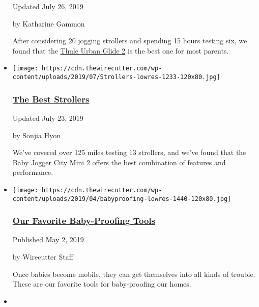 \begin{itemize}
  Updated July 26, 2019

  by Katharine Gammon

  After considering 20 jogging strollers and spending 15 hours testing
  six, we found that the
  \href{https://www.nytimes3xbfgragh.onion/wirecutter/out/link/25112/151217/4/71872/?merchant=BuyBuy\%20Baby}{Thule
  Urban Glide 2} is the best one for most parents.
\item
  \href{https://www.nytimes3xbfgragh.onion/wirecutter/reviews/best-strollers/}{}

  \texttt{[image: https://cdn.thewirecutter.com/wp-content/uploads/2019/07/Strollers-lowres-1233-120x80.jpg]}

  \hypertarget{the-best-strollers}{%
  \subsubsection{\texorpdfstring{\href{https://www.nytimes3xbfgragh.onion/wirecutter/reviews/best-strollers/}{The
  Best Strollers}}{The Best Strollers}}\label{the-best-strollers}}

  Updated July 23, 2019

  by Sonjia Hyon

  We've covered over 125 miles testing 13 strollers, and we've found
  that the
  \href{https://www.nytimes3xbfgragh.onion/wirecutter/out/link/33558/155109/4/96668/?merchant=Amazon}{Baby
  Jogger City Mini 2} offers the best combination of features and
  performance.
\item
  \href{https://www.nytimes3xbfgragh.onion/wirecutter/reviews/our-favorite-baby-proofing-tools/}{}

  \texttt{[image: https://cdn.thewirecutter.com/wp-content/uploads/2019/04/babyproofing-lowres-1440-120x80.jpg]}

  \hypertarget{our-favorite-baby-proofing-tools}{%
  \subsubsection{\texorpdfstring{\href{https://www.nytimes3xbfgragh.onion/wirecutter/reviews/our-favorite-baby-proofing-tools/}{Our
  Favorite Baby-Proofing
  Tools}}{Our Favorite Baby-Proofing Tools}}\label{our-favorite-baby-proofing-tools}}

  Published May 2, 2019

  by Wirecutter Staff

  Once babies become mobile, they can get themselves into all kinds of
  trouble. These are our favorite tools for baby-proofing our homes.
\item
  \href{https://www.nytimes3xbfgragh.onion/wirecutter/lists/make-feeding-your-infant-easier/}{}


\end{itemize}
